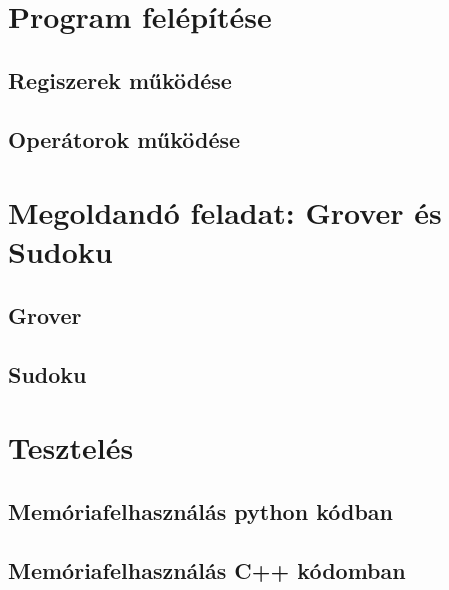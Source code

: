 \documentclass[11pt,a4paper,oneside]{report}
\begin{document}
\selectthesislanguage

\tableofcontents\vfill







\chapter{Program felépítése}

\section{Regiszerek működése}

\section{Operátorok működése}

\chapter{Megoldandó feladat: Grover és Sudoku}

\section{Grover}

\section{Sudoku}

\chapter{Tesztelés}
\section{Memóriafelhasználás python kódban}
\section{Memóriafelhasználás C++ kódomban}

% 
% 
% 



\nocite{*}



\end{document}
